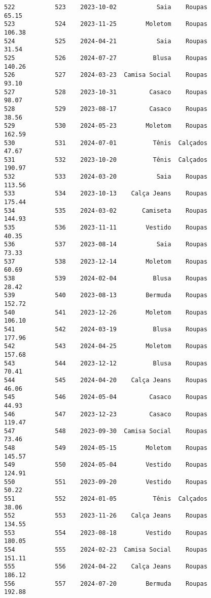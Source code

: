 \documentclass[11pt]{article}
\begin{document}
\begin{Verbatim}[commandchars=\\\{\}]
522           523    2023-10-02           Saia    Roupas           65.15   
523           524    2023-11-25        Moletom    Roupas          106.38   
524           525    2024-04-21           Saia    Roupas           31.54   
525           526    2024-07-27          Blusa    Roupas          140.26   
526           527    2024-03-23  Camisa Social    Roupas           93.10   
527           528    2023-10-31         Casaco    Roupas           98.07   
528           529    2023-08-17         Casaco    Roupas           38.56   
529           530    2024-05-23        Moletom    Roupas          162.59   
530           531    2024-07-01          Tênis  Calçados           47.67   
531           532    2023-10-20          Tênis  Calçados          190.97   
532           533    2024-03-20           Saia    Roupas          113.56   
533           534    2023-10-13    Calça Jeans    Roupas          175.44   
534           535    2024-03-02       Camiseta    Roupas          144.93   
535           536    2023-11-11        Vestido    Roupas           40.35   
536           537    2023-08-14           Saia    Roupas           73.33   
537           538    2023-12-14        Moletom    Roupas           60.69   
538           539    2024-02-04          Blusa    Roupas           28.42   
539           540    2023-08-13        Bermuda    Roupas          152.72   
540           541    2023-12-26        Moletom    Roupas          106.10   
541           542    2024-03-19          Blusa    Roupas          177.96   
542           543    2024-04-25        Moletom    Roupas          157.68   
543           544    2023-12-12          Blusa    Roupas           70.41   
544           545    2024-04-20    Calça Jeans    Roupas           46.06   
545           546    2024-05-04         Casaco    Roupas           44.93   
546           547    2023-12-23         Casaco    Roupas          119.47   
547           548    2023-09-30  Camisa Social    Roupas           73.46   
548           549    2024-05-15        Moletom    Roupas          145.57   
549           550    2024-05-04        Vestido    Roupas          124.91   
550           551    2023-09-20        Vestido    Roupas           50.22   
551           552    2024-01-05          Tênis  Calçados           38.06   
552           553    2023-11-26    Calça Jeans    Roupas          134.55   
553           554    2023-08-18        Vestido    Roupas          180.05   
554           555    2024-02-23  Camisa Social    Roupas          151.11   
555           556    2024-04-22    Calça Jeans    Roupas          186.12   
556           557    2024-07-20        Bermuda    Roupas          192.88   

\end{Verbatim}
\end{document}
